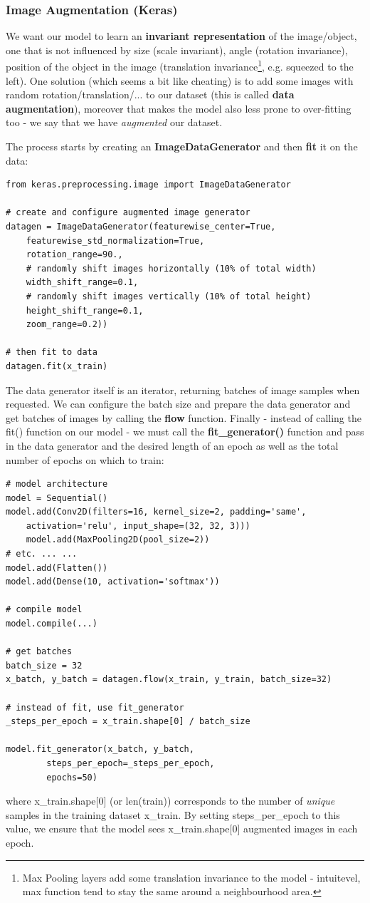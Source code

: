 \documentclass[11pt]{article}
\begin{document}
\subsubsection{Image Augmentation (Keras)}
We want our model to learn an \textbf{invariant representation} of the image/object, one that is not influenced by size (scale invariant), angle (rotation invariance), position  of the object in the image (translation invariance\footnote{Max Pooling layers add some translation invariance to the model - intuitevel, max function tend to stay the same around a neighbourhood area.}, e.g. squeezed to the left). One solution (which seems a bit like cheating) is to add some images with random rotation/translation/... to our dataset (this is called \textbf{data augmentation}), moreover that makes the model also less prone to over-fitting too - we say that we have \textit{augmented} our dataset.

The process starts by creating an \textbf{ImageDataGenerator} and then \textbf{fit} it on the data:
\begin{lstlisting}
from keras.preprocessing.image import ImageDataGenerator

# create and configure augmented image generator
datagen = ImageDataGenerator(featurewise_center=True,
	featurewise_std_normalization=True,
	rotation_range=90.,
	# randomly shift images horizontally (10% of total width)
	width_shift_range=0.1, 
	# randomly shift images vertically (10% of total height)
	height_shift_range=0.1,
	zoom_range=0.2))

# then fit to data
datagen.fit(x_train)
\end{lstlisting}

The data generator itself is an iterator, returning batches of image samples when requested. We can configure the batch size and prepare the data generator and get batches of images by calling the \textbf{flow} function. Finally - instead of calling the fit() function on our model - we must call the \textbf{fit\_generator()} function and pass in the data generator and the desired length of an epoch as well as the total number of epochs on which to train:
\begin{lstlisting}
# model architecture
model = Sequential()
model.add(Conv2D(filters=16, kernel_size=2, padding='same', 
	activation='relu', input_shape=(32, 32, 3)))
	model.add(MaxPooling2D(pool_size=2))
# etc. ... ...
model.add(Flatten())
model.add(Dense(10, activation='softmax'))

# compile model
model.compile(...)

# get batches
batch_size = 32
x_batch, y_batch = datagen.flow(x_train, y_train, batch_size=32)

# instead of fit, use fit_generator
_steps_per_epoch = x_train.shape[0] / batch_size

model.fit_generator(x_batch, y_batch, 
		steps_per_epoch=_steps_per_epoch,
		epochs=50)
\end{lstlisting}
where x\_train.shape[0] (or len(train)) corresponds to the number of \textit{unique} samples in the training dataset x\_train. By setting steps\_per\_epoch to this value, we ensure that the model sees x\_train.shape[0] augmented images in each epoch.
\end{document}
